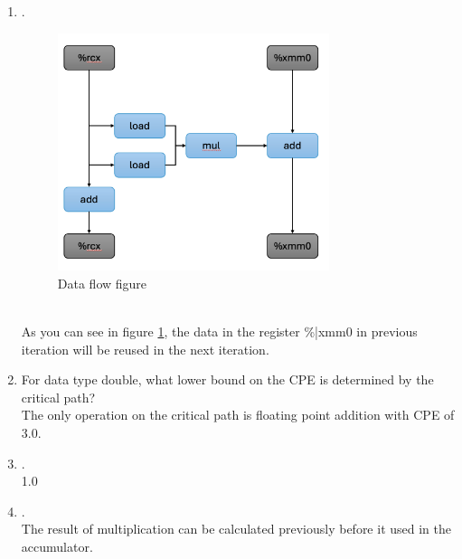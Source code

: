 \documentclass{article}
\begin{document}
\begin{enumerate}[label=\textbf{\Alph*.}]
	\item .\\
	\begin{figure}[h]
		\centering
		\includegraphics[width=0.75\textwidth]{fig1}
		\caption{Data flow figure}
		\label{fig:fig1}
	\end{figure} \\
	As you can see in figure \ref{fig:fig1}, the data in the register \%|xmm0 in
	previous iteration will be reused in the next iteration.
	\item For data type double, what lower bound on the CPE is determined by the
	critical path? \\
	The only operation on the critical path is floating point addition with CPE of
	3.0.
	\item . \\
	1.0
	\item . \\
	The result of multiplication can be calculated previously before it used in
	the accumulator.
\end{enumerate}
\end{document}

